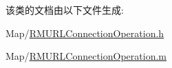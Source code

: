 该类的文档由以下文件生成\-:\begin{DoxyCompactItemize}
\item 
Map/\hyperlink{_r_m_u_r_l_connection_operation_8h}{R\-M\-U\-R\-L\-Connection\-Operation.\-h}\item 
Map/\hyperlink{_r_m_u_r_l_connection_operation_8m}{R\-M\-U\-R\-L\-Connection\-Operation.\-m}\end{DoxyCompactItemize}
